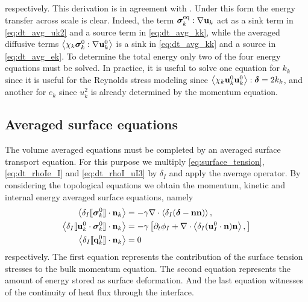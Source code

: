 respectively. 
This derivation is in agreement with \citet{morel2015mathematical}. 
Under this form the energy transfer across scale is clear. 
Indeed, the term $\bm{\sigma}_k^\text{eq} : \mathbf{\nabla} \textbf{u}_k$ act as a sink term in \ref{eq:dt_avg_uk2} and a source term in \ref{eq:dt_avg_kk}, while the averaged diffusive terms $\left<\chi_k\bm{\sigma}_k^0 : \mathbf{\nabla} \textbf{u}_k^0\right>$ is a sink in \ref{eq:dt_avg_kk} and a source in \ref{eq:dt_avg_ek}. 
To determine the total energy only two of the four energy equations must be solved. 
In practice, it is useful to solve one equation for $k_k$ since it is useful for the Reynolds stress modeling since $\left<\chi_k \textbf{u}_k^0 \textbf{u}_k^0\right>: \bm\delta = 2 k_k$, and another for $e_k$ since $u_k^2$ is already determined by the momentum equation. 

\subsection{Averaged surface equations}
The volume averaged equations must be completed by an averaged surface transport equation.  
For this purpose we multiply \ref{eq:surface_tension}, \ref{eq:dt_rhoIe_I} and \ref{eq:dt_rhoI_uI3} by $\delta_I$ and apply the average operator.
By considering the topological equations we obtain the  momentum, kinetic and internal energy averaged surface equations, namely
\begin{align}
    \label{eq:dt_avg_uI}
    \left<\delta_I \llbracket \bm{\sigma}^0_k \rrbracket \cdot \textbf{n}_k\right>
    &= -\gamma \mathbf{\nabla}\cdot \left<\delta_I (\bm\delta - \textbf{nn})\right>,\\
    \label{eq:dt_avg_gamma}
    \left<\delta_I \llbracket \textbf{u}_k^0 \cdot \bm{\sigma}^0_k \rrbracket \cdot \textbf{n}_k\right>
    &= - \gamma \left[
        \partial_t \phi_I
        +  \mathbf{\nabla}\cdot \left<\delta_I (\textbf{u}_{I}^0 \cdot \textbf{n})\textbf{n} \right>,
    \right]\\
    \left<\delta_I \llbracket \textbf{q}^0_k \rrbracket \cdot \textbf{n}_k\right>
    &= 0
\end{align}
respectively. 
The first equation represents the contribution of the surface tension stresses to the bulk momentum equation.
The second equation represents the amount of energy stored as surface deformation.
And the last equation witnesses of the continuity of heat flux through the interface. 

